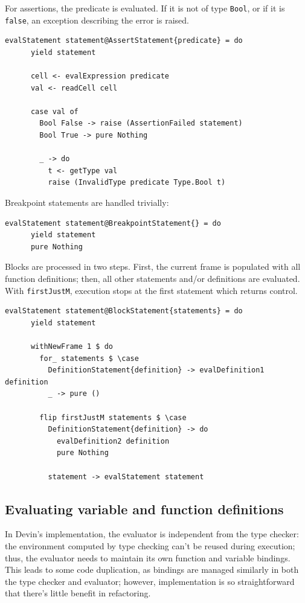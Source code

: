 \documentclass[UdineBachThesis,american,11pt]{PhdThesis}
\begin{document}
  For assertions, the predicate is evaluated. If it is not of type
  \mbox{\texttt{Bool}}, or if it is \mbox{\texttt{false}}, an exception
  describing the error is raised.

  \begin{Verbatim}[gobble=4,fontsize=\small]
    evalStatement statement@AssertStatement{predicate} = do
      yield statement

      cell <- evalExpression predicate
      val <- readCell cell

      case val of
        Bool False -> raise (AssertionFailed statement)
        Bool True -> pure Nothing

        _ -> do
          t <- getType val
          raise (InvalidType predicate Type.Bool t)
  \end{Verbatim}

  Breakpoint statements are handled trivially:

  \begin{Verbatim}[gobble=4,fontsize=\small]
    evalStatement statement@BreakpointStatement{} = do
      yield statement
      pure Nothing
  \end{Verbatim}

  Blocks are processed in two steps. First, the current frame is populated with
  all function definitions; then, all other statements and/or definitions are
  evaluated. With \mbox{\texttt{firstJustM}}, execution stops at the first
  statement which returns control.

  \begin{Verbatim}[gobble=4,fontsize=\small]
    evalStatement statement@BlockStatement{statements} = do
      yield statement

      withNewFrame 1 $ do
        for_ statements $ \case
          DefinitionStatement{definition} -> evalDefinition1 definition
          _ -> pure ()

        flip firstJustM statements $ \case
          DefinitionStatement{definition} -> do
            evalDefinition2 definition
            pure Nothing

          statement -> evalStatement statement
  \end{Verbatim}

  \subsection{Evaluating variable and function definitions}

  In Devin's implementation, the evaluator is independent from the type checker:
  the environment computed by type checking can't be reused during execution;
  thus, the evaluator needs to maintain its own function and variable bindings.
  This leads to some code duplication, as bindings are managed similarly in both
  the type checker and evaluator; however, implementation is so straightforward
  that there's little benefit in refactoring.
\end{document}
